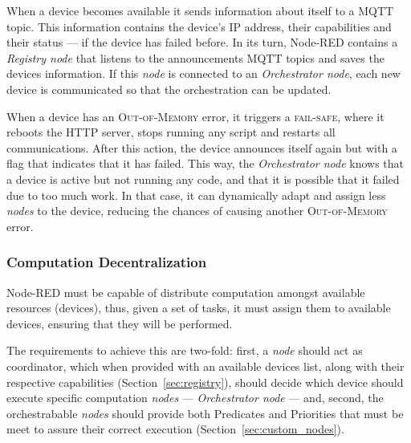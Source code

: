 When a device becomes available it sends information about itself to a MQTT topic. This information contains the device's IP address, their capabilities and their status --- if the device has failed before. In its turn, Node-RED contains a \textit{Registry node} that listens to the announcements MQTT topics and saves the devices information. If this \textit{node} is connected to an \textit{Orchestrator node}, each new device is communicated so that the orchestration can be updated.

When a device has an \textsc{Out-of-Memory} error, it triggers a \textsc{fail-safe}, where it reboots the HTTP server, stops running any script and restarts all communications. After this action, the device announces itself again but with a flag that indicates that it has failed. This way, the \textit{Orchestrator node} knows that a device is active but not running any code, and that it is possible that it failed due to too much work. In that case, it can dynamically adapt and assign less \textit{nodes} to the device, reducing the chances of causing another \textsc{Out-of-Memory} error.

\subsubsection{Computation Decentralization}\label{sec:node_red_computation_decentralization}

Node-RED must be capable of distribute computation amongst available resources (\ie devices), thus, given a set of tasks, it must assign them to available devices, ensuring that they will be performed.

The requirements to achieve this are two-fold: first, a \textit{node} should act as coordinator, which when provided with an available devices list, along with their respective capabilities (\cf Section~\ref{sec:registry}), should decide which device should execute specific computation \textit{nodes} --- \textit{Orchestrator node} --- and, second, the orchestrabable \textit{nodes} should provide both Predicates and Priorities that must be meet to assure their correct execution (\cf Section~\ref{sec:custom_nodes}).

